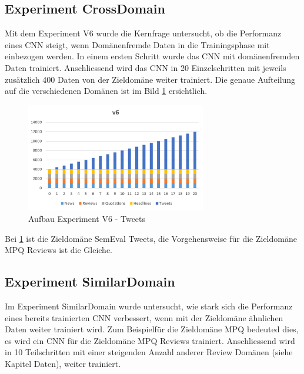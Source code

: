 \subsection{Experiment CrossDomain}
Mit dem Experiment V6 wurde die Kernfrage untersucht, ob die Performanz eines CNN steigt, wenn Domänenfremde Daten in die Trainingsphase mit einbezogen werden.
In einem ersten Schritt wurde das CNN mit domänenfremden Daten trainiert. Anschliessend wird das CNN in 20 Einzelschritten mit jeweils zusätzlich 400 Daten von der Zieldomäne weiter trainiert. Die genaue Aufteilung auf die verschiedenen Domänen ist im Bild \ref{fig:Method_V6} ersichtlich.
\begin{figure}[htbp][H]
	\centering
	\includegraphics[width=0.7\textwidth]{img/Method_V6}
	\caption{Aufbau Experiment V6 - Tweets}
	\label{fig:Method_V6}
\end{figure}
Bei \ref{fig:Method_V6} ist die Zieldomäne SemEval Tweets, die Vorgehensweise für die Zieldomäne MPQ Reviews ist die Gleiche.
\subsection{Experiment SimilarDomain}
Im Experiment SimilarDomain wurde untersucht, wie stark sich die Performanz eines bereits trainierten CNN verbessert, wenn mit der Zieldomäne ähnlichen Daten weiter trainiert wird. Zum Beispielfür die Zieldomäne MPQ bedeuted dies, es wird ein CNN für die Zieldomäne MPQ Reviews trainiert. Anschliessend wird in 10 Teilschritten mit einer steigenden Anzahl anderer Review Domänen (siehe Kapitel Daten), weiter trainiert.

